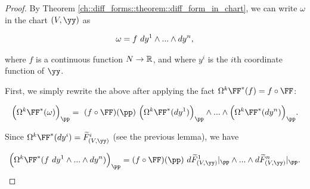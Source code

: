 \begin{proof}
     By Theorem \ref{ch::diff_forms::theorem::diff_form_in_chart}, we can write $\omega$ in the chart $(V, \yy)$ as
    
    \begin{align*}
        \omega = f \text{ } dy^1 \wedge ... \wedge dy^n,
    \end{align*}
    
    where $f$ is a continuous function $N \rightarrow \mathbb{R}$, and where $y^i$ is the $i$th coordinate function of $\yy$.
    
    
    
   First, we simply rewrite the above after applying the fact $\Omega^k \FF^*(f) = f \circ \FF$:

    \begin{align*}
        \Big(\Omega^k \FF^*(\omega) \Big)_\pp = \spc (f \circ \FF)(\pp) \spc 
        \Big( \Omega^k \FF^*(dy^1) \Big)_\pp \wedge ... \wedge \Big( \Omega^k \FF^*(dy^n) \Big)_\pp.
    \end{align*}
 
    Since $\Omega^k \FF^*(dy^i) = \tF_{(V, \yy)}^i$ (see the previous lemma), we have
    
    \begin{align*}
        \Big(\Omega^k \FF^*(f \spc dy^1 \wedge ... \wedge dy^n ) \Big)_\pp = (f \circ \FF)(\pp) \spc 
        d\tF_{(V, \yy)}^1|_\pp \wedge ... \wedge d\tF_{(V, \yy)}^n|_\pp.
    \end{align*}
    
    
    

\end{proof}
